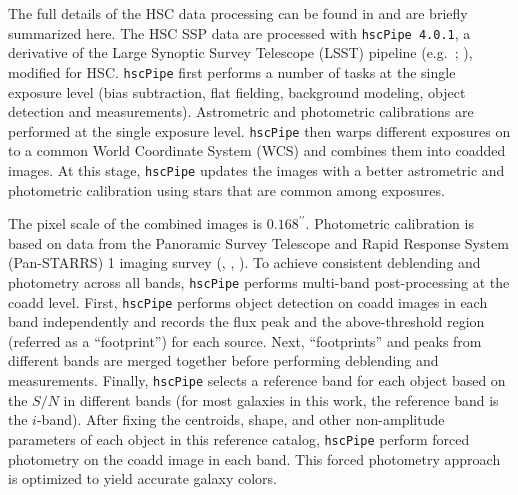\documentclass[a4paper,fleqn,usenatbib]{mnras}
\def\arcsec{{\prime\prime}}
\begin{document}
    The full details of the HSC data processing can be found in \citet{BoschInPrep}
    and are briefly summarized here. 
    The HSC SSP data are processed with \texttt{hscPipe 4.0.1}, a derivative of the 
    Large Synoptic Survey Telescope (LSST) pipeline (e.g.\ \citealt{Juric2015}; 
    \citealt{Axelrod2010}), modified for HSC. 
    \texttt{hscPipe} first performs a number of tasks at the single exposure level 
    (bias subtraction, flat fielding, background modeling, object detection and 
    measurements). 
    Astrometric and photometric calibrations are performed at the single exposure level. 
    \texttt{hscPipe} then warps different exposures on to a common World Coordinate 
    System (WCS) and combines them into coadded images. 
    At this stage, \texttt{hscPipe} updates the images with a better astrometric and 
    photometric calibration using stars that are common among exposures. 
    
    The pixel scale of the combined images is $0.168^{\arcsec}$. 
    Photometric calibration is based on data from the Panoramic Survey Telescope 
    and Rapid Response System (Pan-STARRS) 1 imaging survey 
    (\citealt{Schlafly2012}, \citealt{Tonry2012}, \citealt{Magnier2013}). 
    To achieve consistent deblending and photometry across all bands, \texttt{hscPipe} 
    performs multi-band post-processing at the coadd level. 
    First, \texttt{hscPipe} performs object detection on coadd images in each band 
    independently and records the flux peak and the above-threshold region 
    (referred as a ``footprint'') for each source. 
    Next, ``footprints'' and peaks from different bands are merged together before     
    performing deblending and measurements. 
    Finally, \texttt{hscPipe} selects a reference band for each object based on the 
    $S/N$ in different bands (for most galaxies in this work, the reference band is 
    the $i$-band). 
    After fixing the centroids, shape, and other non-amplitude parameters of each 
    object in this reference catalog, \texttt{hscPipe} perform forced photometry 
    on the coadd image in each band. 
    This forced photometry approach is optimized to yield accurate galaxy colors. 
       
\end{document}
